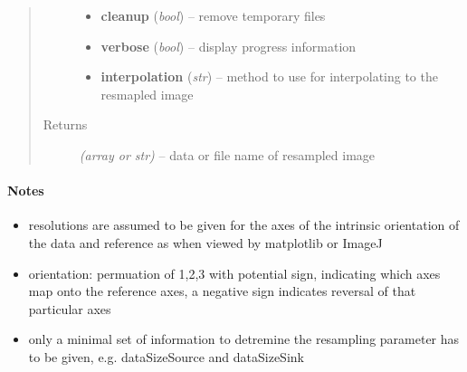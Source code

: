 \documentclass[letterpaper,10pt,english]{sphinxmanual}
\begin{document}
\begin{fulllineitems}
\begin{quote}
\begin{description}
\begin{itemize}
\item {} 
\textbf{cleanup} (\emph{bool}) --
remove temporary files

\item {} 
\textbf{verbose} (\emph{bool}) --
display progress information

\item {} 
\textbf{interpolation} (\emph{str}) --
method to use for interpolating to the resmapled image

\end{itemize}

\item[{Returns}] \leavevmode
\emph{(array or str)} --
data or file name of resampled image

\end{description}\end{quote}
\paragraph{Notes}
\begin{itemize}
\item {} 
resolutions are assumed to be given for the axes of the intrinsic
orientation of the data and reference as when viewed by matplotlib or ImageJ

\item {} 
orientation: permuation of 1,2,3 with potential sign, indicating which
axes map onto the reference axes, a negative sign indicates reversal
of that particular axes

\item {} 
only a minimal set of information to detremine the resampling parameter
has to be given, e.g. dataSizeSource and dataSizeSink

\end{itemize}

\end{fulllineitems}

\end{document}
